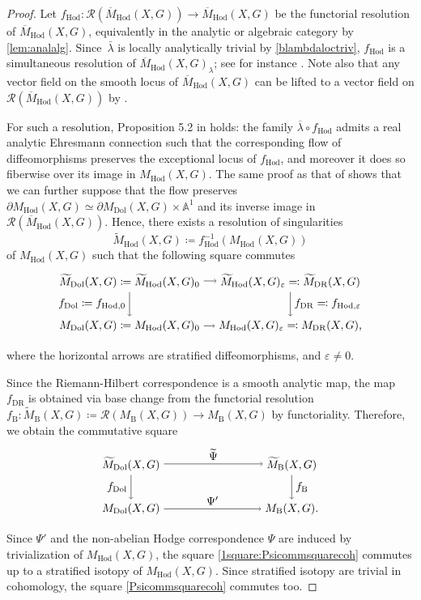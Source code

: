 \documentclass[11pt]{article}
\let\mathcal\mathscr
\let\epsilon\varepsilon
\theoremstyle{definition}
\newcommand{\Aff}{\mathbb{A}}
\newcommand{\MDolG}{{M}_{\mathrm{Dol}}(X,G)}
\newcommand{\MBG}{{M}_{\mathrm{B}}(X,G)}
\newcommand{\MDRG}{{M}_{\mathrm{DR}}(X,G)}
\newcommand{\MHodG}{{M}_{\mathrm{Hod}}(X,G)}
\newcommand{\bMHodG}{\overline{M}_{\mathrm{Hod}}(X,G)}
\newcommand{\tMHodG}{\widetilde{M}_{\mathrm{Hod}}(X,G)}
\newcommand{\tMBG}{\widetilde{M}_{\mathrm{B}}(X,G)}
\newcommand{\tMDolG}{\widetilde{M}_{\mathrm{Dol}}(X,G)}
\newcommand{\tMDRG}{\widetilde{M}_{\mathrm{DR}}(X,G)}
\begin{document}
\begin{proof}
Let $f_{\mathrm{Hod}} \colon \mathcal{R}(\bMHodG) \to \bMHodG$ be the functorial resolution of $\bMHodG$, equivalently in the analytic or algebraic category by \cref{lem:analalg}. Since~$\bar{\lambda}$ is locally analytically trivial by \cref{blambdaloctriv}, $f_{\mathrm{Hod}}$ is a simultaneous resolution of $\bMHodG_{\lambda}$; see for instance \cite[Lem.\,4.2]{Graf}. Note also that any
vector field on the smooth locus of $\bMHodG$ can be lifted to a vector field on $\mathcal{R}(\bMHodG)$ by \cite[Cor.\,4.7]{GKK10}.

For such a resolution, Proposition 5.2 in \cite{AV21} holds: the family $ \overline{\lambda} \circ f_{\mathrm{Hod}}$
admits a real analytic Ehresmann connection such that the corresponding flow of
diffeomorphisms preserves the exceptional locus of $f_{\mathrm{Hod}}$, and moreover it does so
fiberwise over its image in $\MHodG$. The same proof as that of \cite[Prop.\,5.2]{AV21} shows that we can further suppose that the flow preserves $\partial\MHodG \simeq \partial \MDolG \times \Aff^1$ and its inverse image in $\mathcal{R}(\bMHodG)$. Hence, there exists a resolution of singularities
\[
\tMHodG \coloneqq f_{\mathrm{Hod}}^{-1}(\MHodG)
\]
of $\MHodG$ such that the following square commutes
\[
\begin{tikzpicture}
\node (A) at (0,1.4) {$\tMDolG \coloneqq \tMHodG_0$};
\node (B) at (5,1.4) {$ \tMHodG_{\epsilon} \eqqcolon \tMDRG$};
\node (C) at (0,0) {$\MDolG \coloneqq \MHodG_0$};
\node (D) at (5,0) {$\MHodG_{\epsilon} \eqqcolon \MDRG$,};
\draw%
[->] (A) -- (C) node [midway,left] {$f_{\mathrm{Dol}}\coloneqq f_{\mathrm{Hod},0}$};
\draw%
[->] (B) -- (D) node [midway,right] {$f_{\mathrm{DR}}\eqqcolon f_{\mathrm{Hod},\epsilon}$};
\draw%
[->] (A) -- (B) node [midway,above]{};
\draw%
[->] (C) -- (D) node [midway,above]{};
\end{tikzpicture}
\]
where the horizontal arrows are stratified diffeomorphisms, and $\epsilon \neq 0$.

Since the Riemann-Hilbert correspondence is a smooth analytic map, the map $f_{\mathrm{DR}}$ is obtained via base change from the functorial resolution $f_{\mathrm{B}}\colon \tMBG \coloneqq \mathcal{R}(\MBG)\to \MBG$ by functoriality. Therefore, we obtain the commutative square
\[
\begin{tikzpicture}
\node (A) at (0,1.4) {$\tMDolG$};
\node (B) at (5,1.4) {$\tMBG$};
\node (C) at (0,0) {$\MDolG$};
\node (D) at (5,0) {$\MBG$.};
\draw%
[->] (A) -- (C) node [midway,left] {$f_{\mathrm{Dol}}$};
\draw%
[->] (B) -- (D) node [midway,right] {$f_{\mathrm{B}}$};
\draw%
[->] (A) -- (B)node [midway,above] {$\widetilde{\Psi}$};
\draw%
[->] (C) -- (D) node [midway,above] {$\Psi'$};
\end{tikzpicture}
\]
Since $\Psi'$ and the non-abelian Hodge correspondence $\Psi$ are induced by trivialization of $\MHodG$, the square \eqref{1square:Psicommsquarecoh} commutes up to a stratified isotopy of $M_{\mathrm{Hod}}(X,G)$. Since stratified isotopy are trivial in cohomology, the square \eqref{Psicommsquarecoh} commutes too.


\end{proof}
\end{document}

